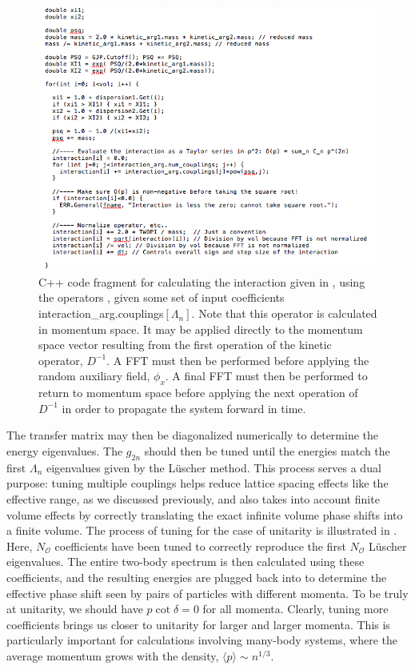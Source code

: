 \begin{figure}
\begin{center}
\includegraphics[width=\linewidth]{Chapter5-figures/interaction}
\end{center}
\caption{\label{fig:interaction}C++ code fragment for calculating the interaction given in , using the operators , given some set of input coefficients interaction\_arg.couplings$[\Lambda_n]$. Note that this operator is calculated in momentum space. It may be applied directly to the momentum space vector resulting from the first operation of the kinetic operator, $D^{-1}$. A FFT must then be performed before applying the random auxiliary field, $\phi_x$. A final FFT must then be performed to return to momentum space before applying the next operation of $D^{-1}$ in order to propagate the system forward in time.}
\end{figure}

The transfer matrix may then be diagonalized numerically to determine the energy eigenvalues. The $g_{2n}$ should then be tuned until the energies match the first $\Lambda_n$ eigenvalues given by the L\"uscher method. This process serves a dual purpose: tuning multiple couplings helps reduce lattice spacing effects like the effective range, as we discussed previously, and also takes into account finite volume effects by correctly translating the exact infinite volume phase shifts into a finite volume. The process of tuning for the case of unitarity is illustrated in . Here, $N_{{\mathcal{ O}}}$ coefficients have been tuned to correctly reproduce the first $N_{{\mathcal{ O}}}$ L\"uscher eigenvalues. The entire two-body spectrum is then calculated using these coefficients, and the resulting energies are plugged back into  to determine the effective phase shift seen by pairs of particles with different momenta. To be truly at unitarity, we should have $p\cot\delta = 0$ for all momenta. Clearly, tuning more coefficients brings us closer to unitarity for larger and larger momenta. This is particularly important for calculations involving many-body systems, where the average momentum grows with the density, $\langle p \rangle \sim n^{1/3}$.

